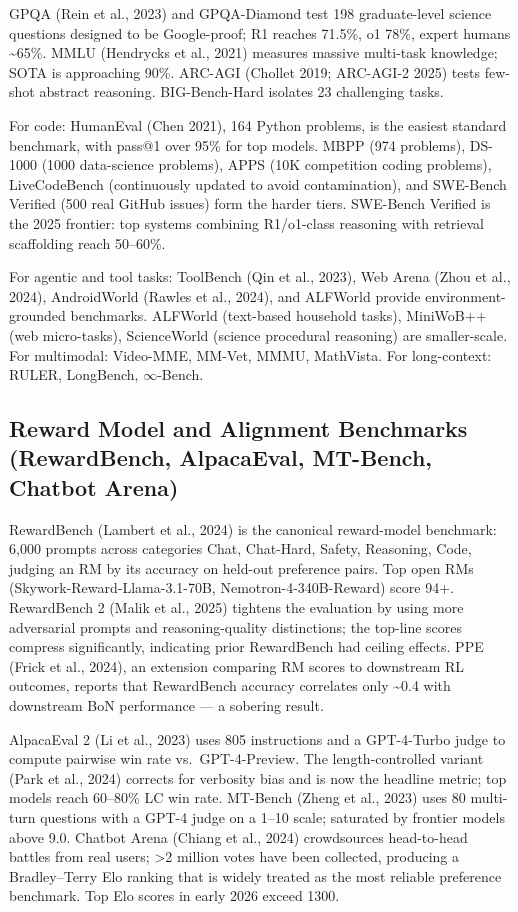 GPQA (Rein et al., 2023) and GPQA-Diamond test 198 graduate-level science questions designed to be Google-proof; R1 reaches 71.5\%, o1 78\%, expert humans \textasciitilde65\%. MMLU (Hendrycks et al., 2021) measures massive multi-task knowledge; SOTA is approaching 90\%. ARC-AGI (Chollet 2019; ARC-AGI-2 2025) tests few-shot abstract reasoning. BIG-Bench-Hard isolates 23 challenging tasks.

For code: HumanEval (Chen 2021), 164 Python problems, is the easiest standard benchmark, with pass@1 over 95\% for top models. MBPP (974 problems), DS-1000 (1000 data-science problems), APPS (10K competition coding problems), LiveCodeBench (continuously updated to avoid contamination), and SWE-Bench Verified (500 real GitHub issues) form the harder tiers. SWE-Bench Verified is the 2025 frontier: top systems combining R1/o1-class reasoning with retrieval scaffolding reach 50--60\%.

For agentic and tool tasks: ToolBench (Qin et al., 2023), Web Arena (Zhou et al., 2024), AndroidWorld (Rawles et al., 2024), and ALFWorld provide environment-grounded benchmarks. ALFWorld (text-based household tasks), MiniWoB++ (web micro-tasks), ScienceWorld (science procedural reasoning) are smaller-scale. For multimodal: Video-MME, MM-Vet, MMMU, MathVista. For long-context: RULER, LongBench, \(\infty\)-Bench.

\subsection{Reward Model and Alignment Benchmarks (RewardBench, AlpacaEval, MT-Bench, Chatbot Arena)}\label{reward-model-and-alignment-benchmarks-rewardbench-alpacaeval-mt-bench-chatbot-arena}

RewardBench (Lambert et al., 2024) is the canonical reward-model benchmark: 6,000 prompts across categories Chat, Chat-Hard, Safety, Reasoning, Code, judging an RM by its accuracy on held-out preference pairs. Top open RMs (Skywork-Reward-Llama-3.1-70B, Nemotron-4-340B-Reward) score 94+. RewardBench 2 (Malik et al., 2025) tightens the evaluation by using more adversarial prompts and reasoning-quality distinctions; the top-line scores compress significantly, indicating prior RewardBench had ceiling effects. PPE (Frick et al., 2024), an extension comparing RM scores to downstream RL outcomes, reports that RewardBench accuracy correlates only \textasciitilde0.4 with downstream BoN performance --- a sobering result.

AlpacaEval 2 (Li et al., 2023) uses 805 instructions and a GPT-4-Turbo judge to compute pairwise win rate vs.~GPT-4-Preview. The length-controlled variant (Park et al., 2024) corrects for verbosity bias and is now the headline metric; top models reach 60--80\% LC win rate. MT-Bench (Zheng et al., 2023) uses 80 multi-turn questions with a GPT-4 judge on a 1--10 scale; saturated by frontier models above 9.0. Chatbot Arena (Chiang et al., 2024) crowdsources head-to-head battles from real users; \textgreater2 million votes have been collected, producing a Bradley--Terry Elo ranking that is widely treated as the most reliable preference benchmark. Top Elo scores in early 2026 exceed 1300.

